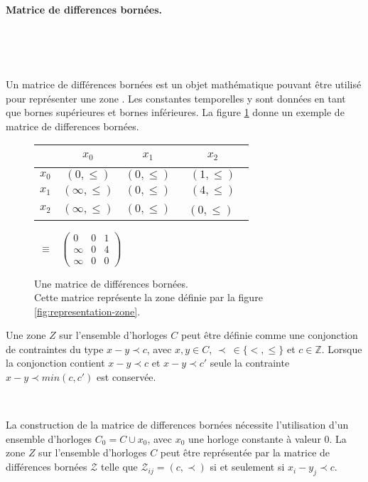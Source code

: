 \documentclass{article}
\begin{document}
        \paragraph{Matrice de differences bornées.} ~

          ~

          Un matrice de différences bornées est un objet mathématique pouvant
          être utilisé pour représenter une zone \cite{dill90}. Les constantes
          temporelles y sont données en tant que bornes supérieures et bornes
          inférieures. La figure \ref{fig:matrice-diff} donne un exemple de
          matrice de differences bornées.

          \begin{figure}
            \centering
            \begin{tabular}{c|ccc}
              ~ & $x_0$ & $x_1$ & $x_2$ \\ \hline
              $x_0 $ & $(0,\leq)$ & $(0,\leq)$ & $(1,\leq)$ \\
              $x_1 $ & $(\infty,\leq)$ & $(0,\leq)$ & $(4,\leq)$ \\
              $x_2 $ & $(\infty,\leq)$ & $(0,\leq)$ & ~$(0,\leq)$
              ~
            \end{tabular} ~$\equiv$~
              $\left(
              \begin{array}{ccc}
                0 & 0 & 1 \\
                \infty & 0 & 4 \\
                \infty & 0 & 0
              \end{array}
              \right)$

            \caption{Une matrice de différences bornées. \\
              Cette matrice représente la zone définie par la figure
              \ref{fig:representation-zone}.}
            \label{fig:matrice-diff}
          \end{figure}

          Une zone $Z$ sur l'ensemble d'horloges $C$ peut être définie comme une
          conjonction de contraintes du type $x - y \prec c$, avec $x, y \in C$,
          $\prec~\in \{<,\le\}$ et $c \in \mathbb{Z}$. Lorsque la conjonction
          contient $x - y \prec c$ et $x - y \prec c'$ seule la contrainte $x -
          y \prec min(c,c')$ est conservée.

          ~

          La construction de la matrice de differences bornées nécessite
          l'utilisation d'un ensemble d'horloges $C_0 = C \cup x_0$, avec $x_0$
          une horloge constante à valeur $0$. La zone $Z$ sur l'ensemble
          d'horloges $C$ peut être représentée par la matrice de différences
          bornées $\mathcal{Z}$ telle que $\mathcal{Z}_{ij} = (c,\prec)$ si et
          seulement si $x_i - y_j \prec c$.
\end{document}
